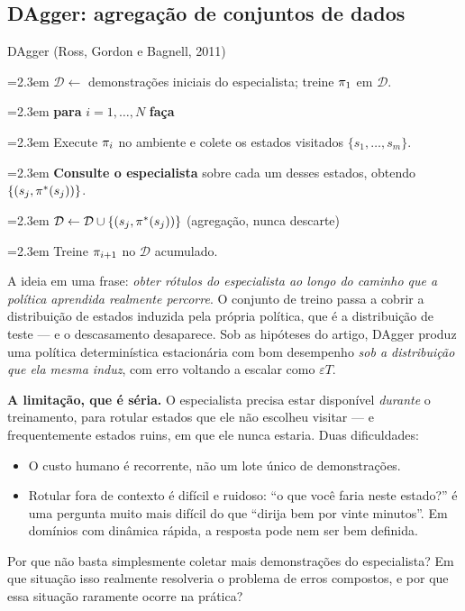 \documentclass[11pt]{article}
\newcommand{\polE}{\pol^{*}}
\newcommand{\Dtot}{\mathcal{D}}
\newcounter{plin}
\newcommand{\pl}[2][0em]{%
  \stepcounter{plin}%
  \par\noindent
  \hangindent=2.3em \hangafter=1
  \makebox[1.6em][r]{\color{rlCinza}\scriptsize\theplin:}\hspace{0.5em}\hspace*{#1}\ignorespaces#2\par}
\newenvironment{pseudo}%
  {\par\setcounter{plin}{0}\small\setlength{\parskip}{0.3ex}}%
  {\par}
\begin{document}
\subsection{DAgger: agregação de conjuntos de dados}

\begin{algbox}{DAgger (Ross, Gordon e Bagnell, 2011)}
\begin{pseudo}
\pl{$\Dtot \leftarrow$ demonstrações iniciais do especialista; treine $\pi_1$ em $\Dtot$.}
\pl{\textbf{para} $i = 1,\dots,N$ \textbf{faça}}
\pl[1.2em]{Execute $\pi_i$ no ambiente e colete os estados visitados $\{s_1,\dots,s_m\}$.}
\pl[1.2em]{\textbf{Consulte o especialista} sobre cada um desses estados, obtendo
  $\{(s_j, \polE(s_j))\}$.}
\pl[1.2em]{$\Dtot \leftarrow \Dtot \cup \{(s_j, \polE(s_j))\}$ \quad (agregação, nunca descarte)}
\pl[1.2em]{Treine $\pi_{i+1}$ no $\Dtot$ acumulado.}
\end{pseudo}
\end{algbox}

A ideia em uma frase: \emph{obter rótulos do especialista ao longo do caminho que a
política aprendida realmente percorre}. O conjunto de treino passa a cobrir a
distribuição de estados induzida pela própria política, que é a distribuição de teste ---
e o descasamento desaparece. Sob as hipóteses do artigo, DAgger produz uma política
determinística estacionária com bom desempenho \emph{sob a distribuição que ela mesma
induz}, com erro voltando a escalar como $\varepsilon T$.

\begin{alertabox}
  \textbf{A limitação, que é séria.} O especialista precisa estar disponível
  \emph{durante} o treinamento, para rotular estados que ele não escolheu visitar --- e
  frequentemente estados ruins, em que ele nunca estaria. Duas dificuldades:
  \begin{itemize}
    \item O custo humano é recorrente, não um lote único de demonstrações.
    \item Rotular fora de contexto é difícil e ruidoso: ``o que você faria neste estado?''
      é uma pergunta muito mais difícil do que ``dirija bem por vinte minutos''. Em
      domínios com dinâmica rápida, a resposta pode nem ser bem definida.
  \end{itemize}
\end{alertabox}

\begin{discbox}
  Por que não basta simplesmente coletar mais demonstrações do especialista? Em que
  situação isso realmente resolveria o problema de erros compostos, e por que essa
  situação raramente ocorre na prática?
\end{discbox}
\end{document}
